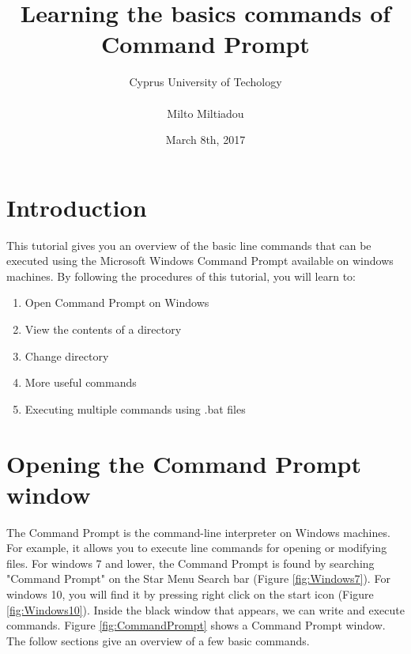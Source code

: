 \documentclass{article}
\title{ \textbf{Learning the basics commands of \\ Command Prompt}}
\author{Cyprus University of Techology \\ \\ Milto Miltiadou}
\date{March 8th, 2017}
\begin{document}
	\setlength{\parindent}{0cm}
		\maketitle
			\setcounter{secnumdepth}{0}
		\section{Introduction}
		
	\par This tutorial gives you an overview of the basic line commands that can be executed using the Microsoft Windows  Command Prompt available on windows machines. By following the procedures of this tutorial, you will learn to: 
	
	\begin{enumerate}
		\item Open Command Prompt on Windows
		\item View the contents of a directory 
		\item Change directory
		\item More useful commands
		\item Executing multiple commands using .bat files 
	\end{enumerate}
			\setcounter{secnumdepth}{3}
			
	\section{Opening the Command Prompt window}
	 
	 \par The Command Prompt is the command-line interpreter on Windows machines. For example, it allows you to execute line commands for opening or modifying files. For windows 7 and lower, the Command Prompt is found by searching "Command Prompt" on the Star Menu Search bar (Figure \ref{fig:Windows7}). For windows 10, you will find it by pressing right click on the start icon (Figure \ref{fig:Windows10}). Inside the black window that appears, we can write and execute  commands. Figure \ref{fig:CommandPrompt} shows a Command Prompt window. The follow sections give an overview of a few basic commands. 
	 
\end{document}
